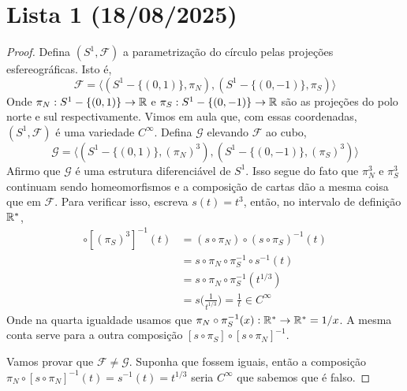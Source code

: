 \section{Lista 1 (18/08/2025)}

\prob
\begin{proof}
    Defina $(S^1, \mathcal{F})$ a parametrização do círculo pelas projeções esfereográficas. Isto é,
    $$\mathcal{F} = \langle (S^1 - \{(0,1)\}, \pi_N), (S^1 - \{(0,-1)\}, \pi_S)\rangle$$
    Onde $\pi_N : S^1 - \{(0,1)\} \rightarrow \mathbb{R}$ e $\pi_S : S^1 - \{(0,-1)\} \rightarrow \mathbb{R}$ são as projeções do polo norte e sul respectivamente. Vimos em aula que, com
    essas coordenadas, $(S^1, \mathcal{F})$ é uma variedade $C^\infty$. Defina $\mathcal{G}$ elevando $\mathcal{F}$ ao cubo,
    $$\mathcal{G} = \langle(S^1 - \{(0,1)\}, (\pi_N)^3), (S^1 - \{(0,-1)\}, (\pi_S)^3)\rangle$$
    Afirmo que $\mathcal{G}$ é uma estrutura diferenciável de $S^1$. Isso segue do fato que $\pi_N^3$ e $\pi_S^3$ continuam sendo homeomorfismos 
    e a composição de cartas dão a mesma coisa que em $\mathcal{F}$. Para verificar isso, escreva $s(t) = t^3$, então, no intervalo de definição $\mathbb{R}^*$,
    \begin{align*}
        [(\pi_N)^{3}] \circ [(\pi_S)^{3}]^{-1} (t) &= (s\circ \pi_N) \circ (s \circ \pi_S)^{-1} (t)\\
                                                   &= s \circ \pi_N \circ \pi_S^{-1} \circ s^{-1} (t) \\
                                                   &= s \circ \pi_N \circ \pi_S^{-1} (t^{1/3})\\
                                                   &= s\bigg(\frac{1}{t^{1/3}}\bigg) = \frac{1}{t} \in C^{\infty}
    \end{align*}
    Onde na quarta igualdade usamos que $\pi_N \circ \pi_S^{-1}(x) : \mathbb{R}^* \rightarrow \mathbb{R}^* = 1/x$. A mesma conta serve para a outra composição $[s\circ \pi_S] \circ [s \circ \pi_N]^{-1}$.

    Vamos provar que $\mathcal{F} \neq \mathcal{G}$. Suponha que fossem iguais, então a composição $\pi_N \circ [s \circ \pi_N]^{-1} (t) = s^{-1} (t) = t^{1/3}$ 
    seria $C^{\infty}$ que sabemos que é falso. 


\end{proof}
